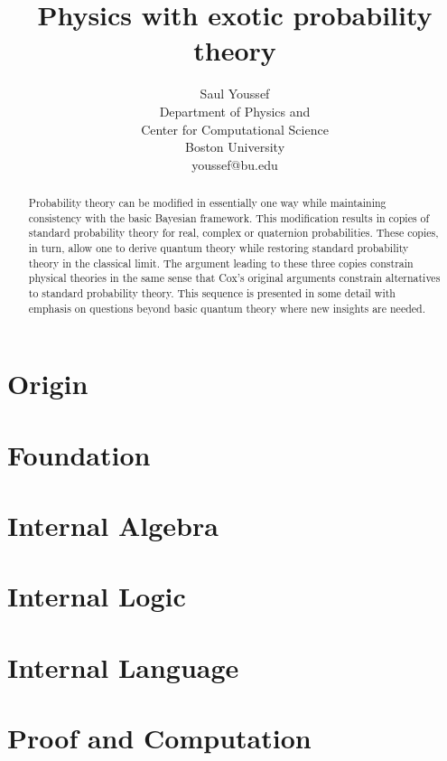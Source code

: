 \documentclass[12pt]{article}
\begin{document}
\title{Physics with exotic probability theory}
\author{%
  Saul Youssef%
  \hfil \\
  Department of Physics and \\
  Center for Computational Science \\
  Boston University \\
  youssef@bu.edu\\
}
\maketitle
\begin{abstract}
Probability theory can be modified in essentially one way while 
maintaining consistency with the basic Bayesian framework.  This
modification results in copies of standard probability theory for
real, complex or quaternion probabilities.  These copies, in turn, 
allow one to derive quantum theory while restoring standard probability 
theory in the classical limit.  The argument leading to these three
copies constrain physical theories in the same sense that Cox's original
arguments constrain alternatives to standard probability
theory.  This sequence is presented in some detail with emphasis 
on questions beyond basic quantum theory where new insights are needed.

\end{abstract}

\section{Origin}
\section{Foundation} 
\section{Internal Algebra}
\section{Internal Logic}
\section{Internal Language}
\section{Proof and Computation}
\end{document}
